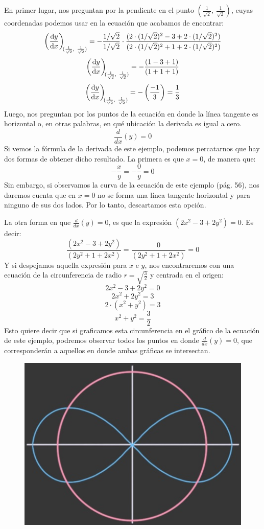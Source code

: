 \documentclass[12pt]{article}
\begin{document}
En primer lugar, nos preguntan por la pendiente en el punto $\left(\frac{1}{\sqrt{2}}, \ \frac{1}{\sqrt{2}}\right)$, cuyas coordenadas podemos usar en la ecuación que acabamos de encontrar:
\[\diff{y}x[(\frac{1}{\sqrt{2}}, \ \frac{1}{\sqrt{2}})] = -\frac{1/\sqrt{2}}{1/\sqrt{2}} \cdot \frac{(2 \cdot (1/\sqrt{2})^{2} - 3 + 2 \cdot (1/\sqrt{2})^{2})}{(2 \cdot (1/\sqrt{2})^{2} + 1 + 2 \cdot (1/\sqrt{2})^{2})}\]
\[\diff{y}x[(\frac{1}{\sqrt{2}}, \ \frac{1}{\sqrt{2}})] = - \frac{(1 - 3 + 1)}{(1 + 1 + 1)}\]
\[\diff{y}x[(\frac{1}{\sqrt{2}}, \ \frac{1}{\sqrt{2}})] = - \left(\frac{-1}{3}\right) = \frac{1}{3}\]
Luego, nos preguntan por los puntos de la ecuación en donde la línea tangente es horizontal o, en otras palabras, en qué ubicación la derivada es igual a cero.
\[\frac{d}{dx} (y) = 0\]
Si vemos la fórmula de la derivada de este ejemplo, podemos percatarnos que hay dos formas de obtener dicho resultado. La primera es que $x = 0$, de manera que:
\[- \frac{x}{y} = - \frac{0}{y} = 0\]
Sin embargo, si observamos la curva de la ecuación de este ejemplo (pág. 56), nos daremos cuenta que en $x = 0$ no se forma una línea tangente horizontal y para ninguno de sus dos lados. Por lo tanto, descartamos esta opción.

La otra forma en que $\frac{d}{dx} (y) = 0$, es que la expresión $(2x^{2} - 3 + 2y^{2}) = 0$. Es decir:
\[\frac{(2x^{2} - 3 + 2y^{2})}{(2y^{2} + 1 + 2x^{2})} = \frac{0}{(2y^{2} + 1 + 2x^{2})} = 0\]
Y si despejamos aquella expresión para $x$ e $y$, nos encontraremos con una ecuación de la circunferencia de radio $r = \sqrt{\frac{3}{2}}$ y centrada en el origen:
\[2x^{2} - 3 + 2y^{2} = 0\]
\[2x^{2} + 2y^{2} = 3\]
\[2 \cdot (x^{2} + y^{2}) = 3\]
\[x^{2} + y^{2} = \frac{3}{2}\]
Esto quiere decir que si graficamos esta circunferencia en el gráfico de la ecuación de este ejemplo, podremos observar todos los puntos en donde $\frac{d}{dx} (y) = 0$, que corresponderán a aquellos en donde ambas gráficas se intersectan.

\begin{figure}[hbt!]
\centering
\includegraphics[scale=0.7]{img/implicit_diff_7.jpg}
\end{figure}
\end{document}
